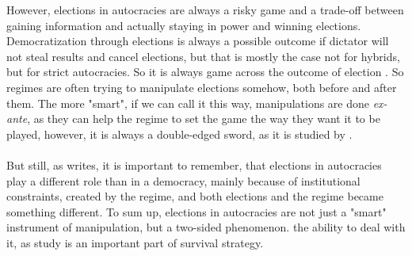 \documentclass[a4paper, 12pt]{article}
\begin{document}
	However, elections in autocracies are always a risky game and a trade-off between gaining information and actually staying in power and winning elections. Democratization through elections is always a possible outcome if dictator will not steal results and cancel elections, but that is mostly the case not for hybrids, but for strict autocracies. So it is always game across the outcome of election \cite{nested}. So regimes are often trying to manipulate elections somehow, both before and after them. The more "smart", if we can call it this way, manipulations are done \textit{ex-ante}, as they can help the regime to set the game the way they want it to be played, however, it is always a double-edged sword, as it is studied by \cite{info_elect_change}.\\\\
	But still, as \cite{manipulation} writes, it is important to remember, that elections in autocracies play a different role than in a democracy, mainly because of institutional constraints, created by the regime, and both elections and the regime became something different. To sum up, elections in autocracies are not just a "smart" instrument of manipulation, but a two-sided phenomenon.  the ability to deal with it, as study \cite{stab1} is an important part of survival strategy.
	
\end{document}
